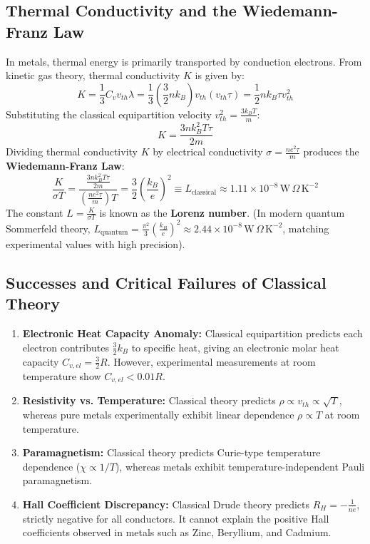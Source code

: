 \subsection{Thermal Conductivity and the Wiedemann-Franz Law}
In metals, thermal energy is primarily transported by conduction electrons. From kinetic gas theory, thermal conductivity $K$ is given by:
\begin{equation}
    K = \frac{1}{3} C_v v_{th} \lambda = \frac{1}{3} \left(\frac{3}{2} n k_B\right) v_{th} (v_{th} \tau) = \frac{1}{2} n k_B \tau v_{th}^2
\end{equation}
Substituting the classical equipartition velocity $v_{th}^2 = \frac{3 k_B T}{m}$:
\begin{equation}
    K = \frac{3 n k_B^2 T \tau}{2 m}
\end{equation}
Dividing thermal conductivity $K$ by electrical conductivity $\sigma = \frac{ne^2\tau}{m}$ produces the \textbf{Wiedemann-Franz Law}:
\begin{equation}
    \frac{K}{\sigma T} = \frac{\frac{3 n k_B^2 T \tau}{2 m}}{\left(\frac{n e^2 \tau}{m}\right) T} = \frac{3}{2} \left(\frac{k_B}{e}\right)^2 \equiv L_{\text{classical}} \approx 1.11 \times 10^{-8}\,\text{W}\,\Omega\,\text{K}^{-2}
\end{equation}
The constant $L = \frac{K}{\sigma T}$ is known as the \textbf{Lorenz number}. (In modern quantum Sommerfeld theory, $L_{\text{quantum}} = \frac{\pi^2}{3}\left(\frac{k_B}{e}\right)^2 \approx 2.44 \times 10^{-8}\,\text{W}\,\Omega\,\text{K}^{-2}$, matching experimental values with high precision).

\subsection{Successes and Critical Failures of Classical Theory}
\begin{pitfallbox}
\begin{enumerate}
    \item \textbf{Electronic Heat Capacity Anomaly:} Classical equipartition predicts each electron contributes $\frac{3}{2}k_B$ to specific heat, giving an electronic molar heat capacity $C_{v,el} = \frac{3}{2}R$. However, experimental measurements at room temperature show $C_{v,el} < 0.01 R$.
    \item \textbf{Resistivity vs. Temperature:} Classical theory predicts $\rho \propto v_{th} \propto \sqrt{T}$, whereas pure metals experimentally exhibit linear dependence $\rho \propto T$ at room temperature.
    \item \textbf{Paramagnetism:} Classical theory predicts Curie-type temperature dependence ($\chi \propto 1/T$), whereas metals exhibit temperature-independent Pauli paramagnetism.
    \item \textbf{Hall Coefficient Discrepancy:} Classical Drude theory predicts $R_H = -\frac{1}{ne}$, strictly negative for all conductors. It cannot explain the positive Hall coefficients observed in metals such as Zinc, Beryllium, and Cadmium.
\end{enumerate}
\end{pitfallbox}

